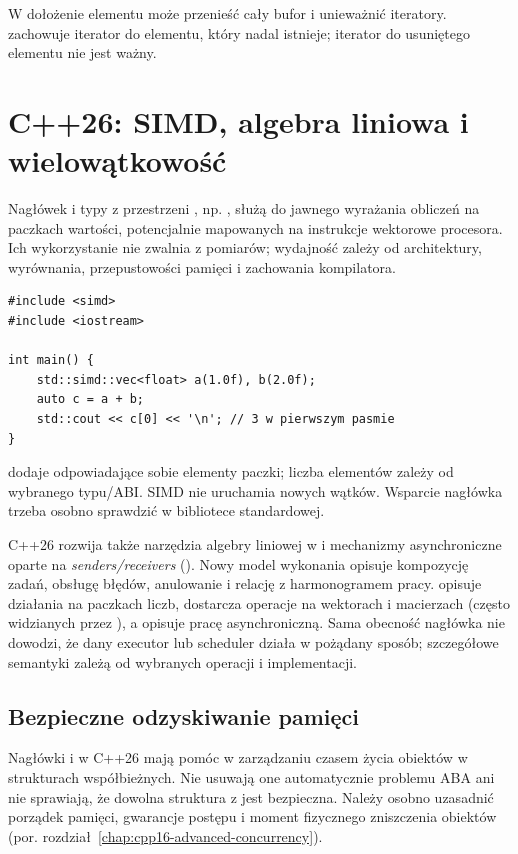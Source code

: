 W  dołożenie elementu może przenieść cały bufor i
unieważnić iteratory.  zachowuje iterator do elementu,
który nadal istnieje; iterator do usuniętego elementu nie jest ważny.

\section{C++26: SIMD, algebra liniowa i wielowątkowość}
\label{sec:cpp21-simd}

Nagłówek  i typy z przestrzeni ,
np. , służą do jawnego
wyrażania obliczeń na paczkach wartości, potencjalnie mapowanych
na instrukcje wektorowe procesora. Ich wykorzystanie nie zwalnia
z pomiarów; wydajność zależy od architektury, wyrównania,
przepustowości pamięci i zachowania kompilatora.

\begin{lstlisting}[caption={Dodawanie kolejnych pasm wartosci SIMD (C++26; wymaga <simd>).}]
#include <simd>
#include <iostream>

int main() {
    std::simd::vec<float> a(1.0f), b(2.0f);
    auto c = a + b;
    std::cout << c[0] << '\n'; // 3 w pierwszym pasmie
}
\end{lstlisting}

 dodaje odpowiadające sobie elementy paczki; liczba
elementów zależy od wybranego typu/ABI. SIMD nie uruchamia nowych
wątków. Wsparcie nagłówka  trzeba osobno sprawdzić
w bibliotece standardowej.

C++26 rozwija także narzędzia algebry liniowej w 
i mechanizmy asynchroniczne oparte na \emph{senders/receivers}
(). Nowy model wykonania opisuje kompozycję zadań,
obsługę błędów, anulowanie i relację z harmonogramem pracy.
 opisuje działania na paczkach liczb, 
dostarcza operacje na wektorach i macierzach (często widzianych przez
), a  opisuje pracę asynchroniczną.
Sama obecność nagłówka nie dowodzi, że dany executor lub scheduler
działa w pożądany sposób; szczegółowe semantyki zależą od wybranych
operacji i implementacji.

\subsection{Bezpieczne odzyskiwanie pamięci}

Nagłówki  i  w C++26 mają pomóc
w zarządzaniu czasem życia obiektów w strukturach współbieżnych.
Nie usuwają one automatycznie problemu ABA ani nie sprawiają,
że dowolna struktura z  jest bezpieczna.
Należy osobno uzasadnić porządek pamięci, gwarancje postępu
i moment fizycznego zniszczenia obiektów (por. rozdział~\ref{chap:cpp16-advanced-concurrency}).


